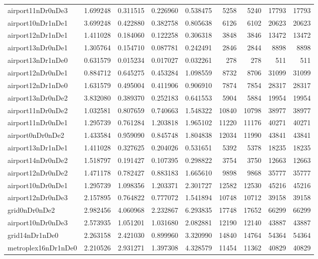 \begin{longtable}{|l|r|r|r|r|r|r|r|r|}
airport11nDr0nDe3 & 1.699248 & 0.311515 & 0.226960 & 0.538475 & 5258 & 5240 & 17793 & 17793 \\
airport10nDr1nDe1 & 3.699248 & 0.422880 & 0.382758 & 0.805638 & 6126 & 6102 & 20623 & 20623 \\
airport12nDr1nDe1 & 1.411028 & 0.184060 & 0.122258 & 0.306318 & 3848 & 3846 & 13472 & 13472 \\
airport13nDr0nDe1 & 1.305764 & 0.154710 & 0.087781 & 0.242491 & 2846 & 2844 & 8898 & 8898 \\
airport13nDr1nDe0 & 0.631579 & 0.015234 & 0.017027 & 0.032261 & 278 & 278 & 511 & 511 \\
airport12nDr0nDe1 & 0.884712 & 0.645275 & 0.453284 & 1.098559 & 8732 & 8706 & 31099 & 31099 \\
airport12nDr1nDe0 & 1.631579 & 0.495004 & 0.411906 & 0.906910 & 7874 & 7854 & 28317 & 28317 \\
airport13nDr0nDe2 & 3.832080 & 0.389370 & 0.252183 & 0.641553 & 5904 & 5884 & 19954 & 19954 \\
airport11nDr0nDe2 & 1.032581 & 0.807659 & 0.740663 & 1.548322 & 10840 & 10798 & 38977 & 38977 \\
airport11nDr0nDe1 & 1.295739 & 0.761284 & 1.203818 & 1.965102 & 11220 & 11176 & 40271 & 40271 \\
airport0nDr0nDe2 & 1.433584 & 0.959090 & 0.845748 & 1.804838 & 12034 & 11990 & 43841 & 43841 \\
airport13nDr1nDe1 & 1.411028 & 0.327625 & 0.204026 & 0.531651 & 5392 & 5378 & 18235 & 18235 \\
airport14nDr0nDe2 & 1.518797 & 0.191427 & 0.107395 & 0.298822 & 3754 & 3750 & 12663 & 12663 \\
airport12nDr0nDe2 & 1.471178 & 0.782427 & 0.883183 & 1.665610 & 9898 & 9868 & 35777 & 35777 \\
airport10nDr0nDe1 & 1.295739 & 1.098356 & 1.203371 & 2.301727 & 12582 & 12530 & 45216 & 45216 \\
airport12nDr0nDe3 & 2.157895 & 0.764822 & 0.777072 & 1.541894 & 10748 & 10712 & 39158 & 39158 \\
grid0nDr0nDe2 & 2.982456 & 4.060968 & 2.232867 & 6.293835 & 17748 & 17652 & 66299 & 66299 \\
airport10nDr0nDe3 & 2.573935 & 1.051201 & 1.031680 & 2.082881 & 12190 & 12140 & 43887 & 43887 \\
grid14nDr1nDe0 & 2.263158 & 2.421030 & 0.899960 & 3.320990 & 14840 & 14764 & 54364 & 54364 \\
metroplex16nDr1nDe0 & 2.210526 & 2.931271 & 1.397308 & 4.328579 & 11454 & 11362 & 40829 & 40829 \\

\end{longtable}
